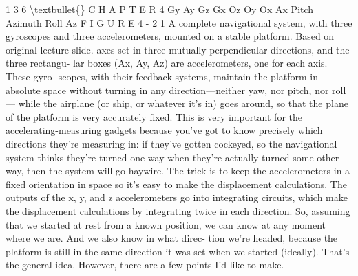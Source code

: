 \documentclass[10pt,oneside]{article}
\begin{document}
1 3 6 \textbackslash{}textbullet\{\} C H A P T E R  4 Gy Ay Gz Gx Oz Oy Ox Ax Pitch Azimuth Roll Az F I G U R E  4 - 2 1 A complete navigational system, with three gyroscopes and three accelerometers, mounted on a stable platform. Based on original lecture slide. axes set in three mutually perpendicular directions, and the three rectangu- lar boxes (Ax, Ay, Az) are accelerometers, one for each axis. These gyro- scopes, with their feedback systems, maintain the platform in absolute space without turning in any direction---neither yaw, nor pitch, nor roll--- while the airplane (or ship, or whatever it’s in) goes around, so that the plane of the platform is very accurately fixed. This is very important for the accelerating-measuring gadgets because you’ve got to know precisely which directions they’re measuring in: if they’ve gotten cockeyed, so the navigational system thinks they’re turned one way when they’re actually turned some other way, then the system will go haywire. The trick is to keep the accelerometers in a fixed orientation in space so it’s easy to make the displacement calculations. The outputs of the x, y, and z accelerometers go into integrating circuits, which make the displacement calculations by integrating twice in each direction. So, assuming that we started at rest from a known position, we can know at any moment where we are. And we also know in what direc- tion we’re headed, because the platform is still in the same direction it was set when we started (ideally). That’s the general idea. However, there are a few points I’d like to make.\par
\end{document}
